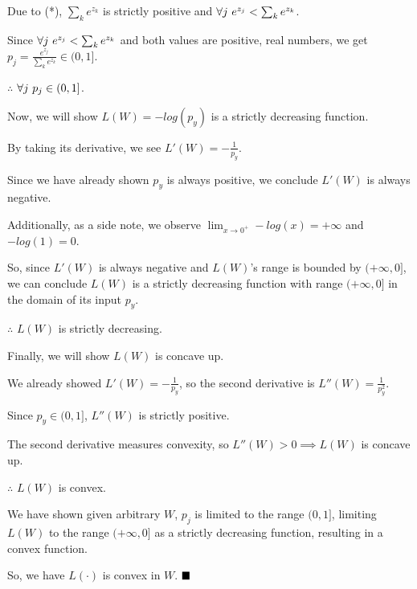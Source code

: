 \begin{enumerate}[resume]
Due to (*), $\sum_k e^{z_k}$ is strictly positive and $\forall j \thinspace\thinspace e^{z_j} < \sum_k e^{z_k}$.

Since $\forall j \thinspace\thinspace e^{z_j} < \sum_k e^{z_k}$ and both values are positive, real numbers, we get $p_j = \frac{e^{z_j}}{\sum_k e^{z_k}} \in (0, 1]$. 

$\therefore$ $\forall j \thinspace\thinspace p_j \in (0, 1]$.

Now, we will show $L(W) = -log(p_y)$ is a strictly decreasing function.

By taking its derivative, we see $L'(W) = -\frac{1}{p_y}$.

Since we have already shown $p_y$ is always positive, we conclude $L'(W)$ is always negative. 

Additionally, as a side note, we observe $\lim_{x\to 0^+} -log(x) = +\infty$ and $-log(1) = 0$.

So, since $L'(W)$ is always negative and $L(W)$'s range is bounded by $(+\infty, 0]$, we can conclude $L(W)$ is a strictly decreasing function with range $(+\infty, 0]$ in the domain of its input $p_y$. 

$\therefore$ $L(W)$ is strictly decreasing.

Finally, we will show $L(W)$ is concave up.

We already showed $L'(W) = -\frac{1}{p_y}$, so the second derivative is $L''(W) = \frac{1}{p_y^2}$.

Since $p_y \in (0, 1]$, $L''(W)$ is strictly positive.

The second derivative measures convexity, so $L''(W) > 0 \implies L(W)$ is concave up.

$\therefore$ $L(W)$ is convex.

We have shown given arbitrary $W$, $p_j$ is limited to the range $(0, 1]$, limiting $L(W)$ to the range $(+\infty, 0]$ as a strictly decreasing function, resulting in a convex function.

So, we have $L(\cdot)$ is convex in $W$. $\hfill\ensuremath{\blacksquare}$



\end{enumerate}

